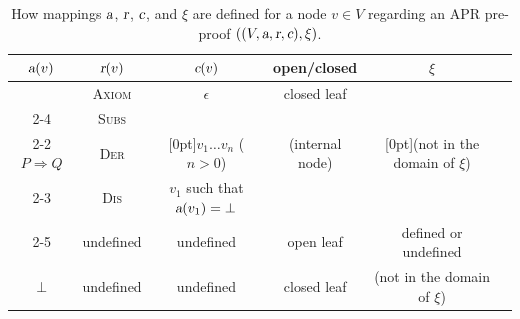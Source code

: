 \documentclass[10pt,a4paper]{article}
\newcommand{\ReachPred}[2]{#1 \Rightarrow #2}
\newcommand{\RuleName}[1]{{\rm \textsc{#1}}}
\newcommand{\varsl}[1]{\mbox{\sl #1}}
\begin{document}
\begin{table}
	\caption{How mappings $\varsl{a}$, $\varsl{r}$, $\varsl{c}$, and $\xi$ are defined for a node $v \in V$ regarding an APR pre-proof $((V,\varsl{a},\varsl{r},\varsl{c}),\xi)$.}
	\label{tbl:APR-pre-proof-nodes}
	\centering
	\begin{tabular}{|c|c|c|c|c|c|}
		\hline
		$\varsl{a}(v)$     & $\varsl{r}(v)$   & $\varsl{c}(v)$                               & open/closed     & $\xi$                                             \\
		\hline\hline
		                   & \RuleName{Axiom} & $\epsilon$                                   & closed leaf     &                                                   \\
		\cline{2-4}
		                   & \RuleName{Subs}  &                                              &                 &                                                   \\
		\cline{2-2}
		$\ReachPred{P}{Q}$ & \RuleName{Der}   & \raisebox{7pt}[0pt]{$v_1\ldots v_n$ ($n>0$)} & (internal node) & \raisebox{7pt}[0pt]{(not in the domain of $\xi$)} \\
		\cline{2-3}
		                   & \RuleName{Dis}   & $v_1$ such that $\varsl{a}(v_1)=\bot$        &                 &                                                   \\
		\cline{2-5}
		                   & undefined        & undefined                                    & open leaf       & defined or undefined                              \\
		\hline
		$\bot$             & undefined        & undefined                                    & closed leaf     & (not in the domain of $\xi$)                      \\
		\hline
	\end{tabular}
\end{table}
\end{document}
